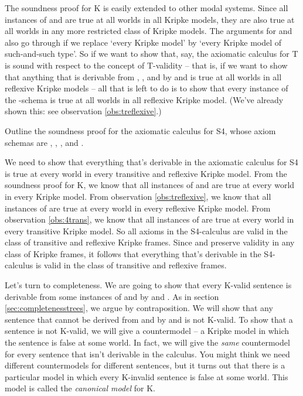 The soundness proof for K is easily extended to other modal systems. Since all
instances of  and  are true at all worlds in all Kripke models,
they are also true at all worlds in any more restricted class of Kripke models.
The arguments for  and  also go through if we replace `every
Kripke model' by `every Kripke model of such-and-such type'. So if we want to
show that, say, the axiomatic calculus for T is sound with respect to the
concept of T-validity -- that is, if we want to show that anything that is
derivable from , , and  by  and  is true at
all worlds in all reflexive Kripke models -- all that is left to do is to show
that every instance of the -schema is true at all worlds in all reflexive
Kripke model. (We've already shown this: see observation \ref{obs:treflexive}.)


\begin{exercise}
  Outline the soundness proof for the axiomatic calculus for S4, whose axiom
  schemas are , , , and .
\end{exercise}
\begin{solution}
  We need to show that everything that's derivable in the axiomatic calculus for
  S4 is true at every world in every transitive and reflexive Kripke model. From
  the soundness proof for K, we know that all instances of  and 
  are true at every world in every Kripke model. From observation
  \ref{obs:treflexive}, we know that all instances of  are true at every
  world in every reflexive Kripke model. From observation \ref{obs:4trans}, we
  know that all instances of  are true at every world in every transitive
  Kripke model. So all axioms in the S4-calculus are valid in the class of
  transitive and reflexive Kripke frames. Since  and  preserve
  validity in any class of Kripke frames, it follows that everything that's
  derivable in the S4-calculus is valid in the class of transitive and reflexive
  frames.
\end{solution}

Let's turn to completeness. We are going to show that every K-valid sentence is
derivable from some instances of  and  by  and .
As in section \ref{sec:completenesstrees}, we argue by contraposition. We will
show that any sentence that cannot be derived from  and  by
 and  is not K-valid. To show that a sentence is not K-valid, we
will give a countermodel -- a Kripke model in which the sentence is false at
some world. In fact, we will give the \emph{same} countermodel for every
sentence that isn't derivable in the calculus. You might think we need different
countermodels for different sentences, but it turns out that there is a
particular model in which every K-invalid sentence is false at some world. This
model is called the \emph{canonical model} for K.

